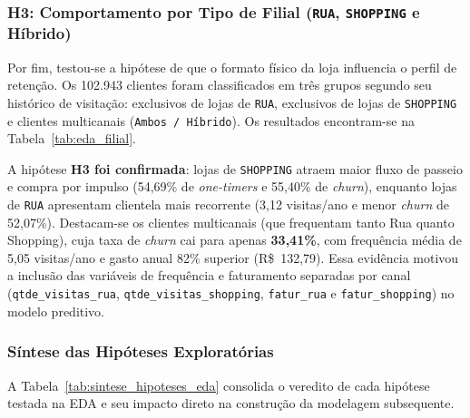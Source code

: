 \subsubsection{H3: Comportamento por Tipo de Filial (\texttt{RUA}, \texttt{SHOPPING} e Híbrido)}
Por fim, testou-se a hipótese de que o formato físico da loja influencia o perfil de retenção. 
Os 102.943 clientes foram classificados em três grupos segundo seu histórico de visitação: exclusivos de lojas de \texttt{RUA}, exclusivos de lojas de \texttt{SHOPPING} e clientes multicanais (\texttt{Ambos / Híbrido}). 
Os resultados encontram-se na Tabela~\ref{tab:eda_filial}.

\begin{table}[H]
\centering
\caption{Comparativo de retenção, frequência e gasto médio anual por canal de atendimento}
\label{tab:eda_filial}
\end{table}

A hipótese \textbf{H3 foi confirmada}: lojas de \texttt{SHOPPING} atraem maior fluxo de passeio e compra por impulso (54,69\% de \textit{one-timers} e 55,40\% de \textit{churn}), enquanto lojas de \texttt{RUA} apresentam clientela mais recorrente (3,12 visitas/ano e menor \textit{churn} de 52,07\%). Destacam-se os clientes multicanais (que frequentam tanto Rua quanto Shopping), cuja taxa de \textit{churn} cai para apenas \textbf{33,41\%}, com frequência média de 5,05 visitas/ano e gasto anual 82\% superior (R\$~132,79). Essa evidência motivou a inclusão das variáveis de frequência e faturamento separadas por canal (\texttt{qtde\_visitas\_rua}, \texttt{qtde\_visitas\_shopping}, \texttt{fatur\_rua} e \texttt{fatur\_shopping}) no modelo preditivo.

\subsubsection{Síntese das Hipóteses Exploratórias}
A Tabela~\ref{tab:sintese_hipoteses_eda} consolida o veredito de cada hipótese testada na EDA e seu impacto direto na construção da modelagem subsequente.

